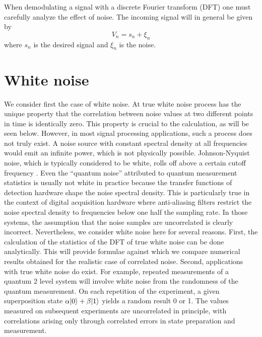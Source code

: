When demodulating a signal with a discrete Fourier transform (DFT) one must carefully analyze the effect of noise.
The incoming signal will in general be given by \begin{equation}
V_{n}=s_{n}+\xi_{n} \end{equation}
where $s_{n}$ is the desired signal and $\xi_{n}$ is the noise.

\section{White noise}

We consider first the case of white noise.
At true white noise process has the unique property that the correlation between noise values at two different points in time is identically zero.
This property is crucial to the calculation, as will be seen below.
However, in most signal processing applications, such a process does not truly exist.
A noise source with constant spectral density at all frequencies would emit an infinite power, which is not physically possible.
Johnson-Nyquist noise, which is typically considered to be white, rolls off above a certain cutoff frequency \cite{Nyquist:noise1928}.
Even the ``quantum noise'' attributed to quantum measurement statistics is usually not white in practice because the transfer functions of detection hardware shape the noise spectral density.
This is particularly true in the context of digital acquisition hardware where anti-aliasing filters restrict the noise spectral density to frequencies below one half the sampling rate.
In those systems, the assumption that the noise samples are uncorrelated is clearly incorrect.
Nevertheless, we consider white noise here for several reasons.
First, the calculation of the statistics of the DFT of true white noise can be done analytically.
This will provide formulae against which we compare numerical results obtained for the realistic case of correlated noise.
Second, applications with true white noise do exist.
For example, repeated measurements of a quantum 2 level system will involve white noise from the randomness of the quantum measurement.
On each repetition of the experiment, a given superposition state $\alpha | 0 \rangle + \beta | 1 \rangle$ yields a random result 0 or 1.
The values measured on subsequent experiments are uncorrelated in principle, with correlations arising only through correlated errors in state preparation and measurement.

